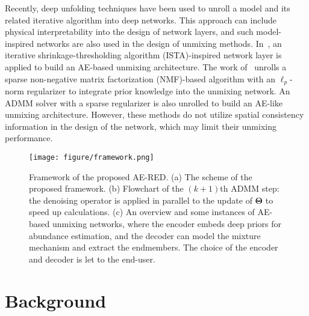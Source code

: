 \documentclass[journal,a4paper]{IEEEtran}
\newcommand{\bTheta}{\boldsymbol{\Theta}}
\begin{document}
Recently, deep unfolding techniques have been used to unroll a model and its related iterative algorithm into deep networks. This approach can include physical interpretability into the design of network layers, and such model-inspired networks are also used in the design of unmixing methods.  In~\cite{qian2020spectral}, an iterative shrinkage-thresholding algorithm (ISTA)-inspired network layer is applied to build an AE-based unmixing architecture. The work of~\cite{xiong2021snmf} unrolls a sparse non-negative matrix factorization (NMF)-based algorithm with an $\ell_p$-norm regularizer to integrate prior knowledge into the unmixing network. An ADMM solver with a sparse regularizer is also unrolled to build an AE-like unmixing architecture.  However, these methods do not utilize spatial consistency information in the design of the network, which may limit their unmixing performance.

\begin{figure*}[!t]
  \centering
  \texttt{[image: figure/framework.png]}\\
  \caption{Framework of the proposed AE-RED. (a) The scheme of the proposed framework. (b) Flowchart of the $(k+1)$th ADMM step: the denoising operator is applied in parallel to the update of $\bTheta$ to speed up calculations. (c) An overview and some instances of AE-based unmixing networks, where the encoder embeds deep priors for abundance estimation, and the decoder can model the mixture mechanism and extract the endmembers. The choice of the encoder and decoder is let to the end-user. }\label{fig.framework}
\end{figure*}

\section{Background} \label{sec:background}
\end{document}
